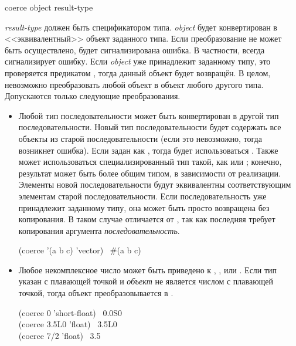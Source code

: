 \begin{defun}[Function]
coerce object result-type

\emph{result-type} должен быть спецификатором типа. \emph{object} будет
конвертирован в <<эквивалентный>> объект заданного типа.
Если преобразование не может быть осуществлено, будет сигнализирована ошибка.
В частности,  всегда сигнализирует ошибку.
Если \emph{object} уже принадлежит заданному типу, это проверяется предикатом
, тогда данный объект будет возвращён.
В целом, невозможно преобразовать любой объект в объект любого другого
типа. Допускаются только следующие преобразования.
\begin{itemize}

\item
Любой тип последовательности может быть конвертирован в другой тип
последовательности. Новый тип последовательности будет содержать все
 объекты из старой последовательности (если это невозможно, тогда возникнет
ошибка). Если  задан как , тогда будет использоваться
. Также может использоваться специализированный тип такой, как  или ; конечно, результат может быть более общим типом, в
зависимости от реализации.
Элементы новой последовательности будут эквивалентны  соответствующим
элементам старой последовательности.
Если последовательность уже принадлежит заданному типу, она может быть просто
возвращена без копирования. В таком случае  отличается от , так как последняя требует
копирования аргумента \emph{последовательность}.

\begin{lisp}
(coerce '(a b c) 'vector) \EV\ \#(a b c)
\end{lisp}

\end{itemize}

\begin{itemize}
\item
Любое некомплексное число может быть приведено к ,
,  или . Если тип указан с
плавающей точкой и \emph{объект} не является числом с плавающей точкой, тогда
объект преобразовывается в .

\begin{lisp}
(coerce 0 'short-float) \EV\ 0.0S0 \\
(coerce 3.5L0 'float) \EV\ 3.5L0 \\
(coerce 7/2 'float) \EV\ 3.5
\end{lisp}


\end{itemize}
\end{defun}
